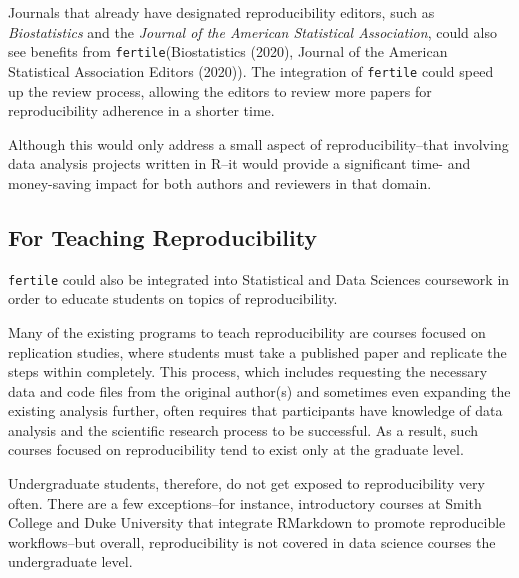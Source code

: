 \documentclass[12pt,twoside]{reedthesis}
\begin{document}
Journals that already have designated reproducibility editors, such as \emph{Biostatistics} and the \emph{Journal of the American Statistical Association}, could also see benefits from \texttt{fertile}(Biostatistics (2020), Journal of the American Statistical Association Editors (2020)). The integration of \texttt{fertile} could speed up the review process, allowing the editors to review more papers for reproducibility adherence in a shorter time.

Although this would only address a small aspect of reproducibility--that involving data analysis projects written in R--it would provide a significant time- and money-saving impact for both authors and reviewers in that domain.

\hypertarget{for-teaching-reproducibility}{%
\subsection{For Teaching Reproducibility}\label{for-teaching-reproducibility}}

\texttt{fertile} could also be integrated into Statistical and Data Sciences coursework in order to educate students on topics of reproducibility.

Many of the existing programs to teach reproducibility are courses focused on replication studies, where students must take a published paper and replicate the steps within completely. This process, which includes requesting the necessary data and code files from the original author(s) and sometimes even expanding the existing analysis further, often requires that participants have knowledge of data analysis and the scientific research process to be successful. As a result, such courses focused on reproducibility tend to exist only at the graduate level.

Undergraduate students, therefore, do not get exposed to reproducibility very often. There are a few exceptions--for instance, introductory courses at Smith College and Duke University that integrate RMarkdown to promote reproducible workflows--but overall, reproducibility is not covered in data science courses the undergraduate level.
\end{document}

